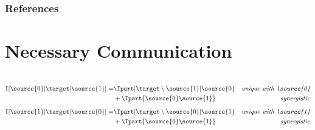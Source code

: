 \documentclass[final,serif,aspectratio=1610]{beamer}
\begin{document}
\begin{frame}[allowframebreaks]
  \frametitle{References}
  \printbibliography[heading=none]
\end{frame}

\appendix

\section{Necessary Communication}

\begin{frame}
  \frametitle{}
  \framesubtitle{}
  \begin{columns}
    \begin{column}{1.0\textwidth}
      \Large

      \begin{align*}
        \I{\source{0} | \target | \source{1}} =
        &\Ipart[\target \setminus \source{1}]{\source{0}}
        & \textrm{\emph{unique with \source{0}}} \\
        & + \Ipart{\source{0}\source{1}}
        & \textrm{\emph{synergistic}}
      \end{align*}
      \begin{align*}
        \I{\source{1} | \target | \source{0}} =
        &\Ipart[\target \setminus \source{0}]{\source{1}}
        & \textrm{\emph{unique with \source{1}}} \\
        & + \Ipart{\source{0}\source{1}}
        & \textrm{\emph{synergistic}}
      \end{align*}
    \end{column}
  \end{columns}
\end{frame}
\end{document}
